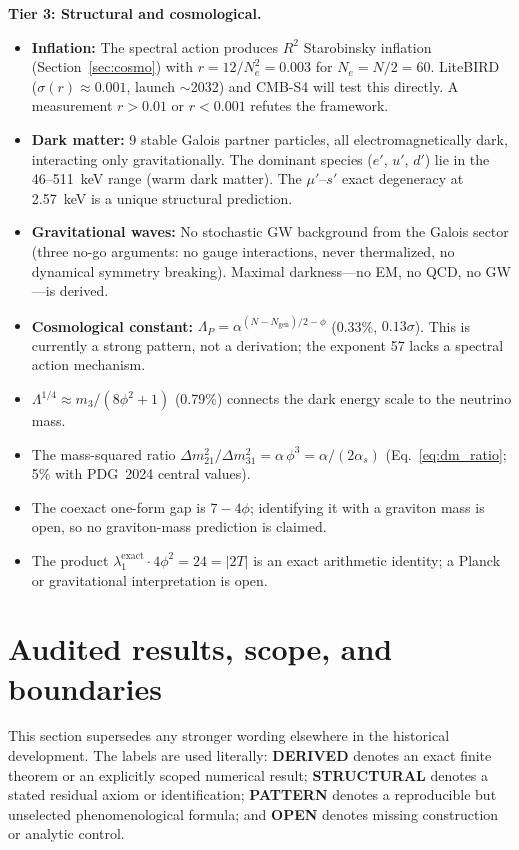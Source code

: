 \documentclass[12pt,a4paper]{article}
\theoremstyle{definition}
\begin{document}
\textbf{Tier 3: Structural and cosmological.}
\begin{itemize}
\item \textbf{Inflation:} The spectral action produces $R^2$ Starobinsky inflation (Section~\ref{sec:cosmo}) with $r = 12/N_e^2 = 0.003$ for $N_e = N/2 = 60$.  LiteBIRD~\cite{LiteBIRD2023} ($\sigma(r) \approx 0.001$, launch $\sim$2032) and CMB-S4 will test this directly.  A measurement $r > 0.01$ or $r < 0.001$ refutes the framework.
\item \textbf{Dark matter:} 9 stable Galois partner particles, all electromagnetically dark, interacting only gravitationally.  The dominant species ($e'$, $u'$, $d'$) lie in the 46--511~keV range (warm dark matter).  The $\mu'$--$s'$ exact degeneracy at 2.57~keV is a unique structural prediction.
\item \textbf{Gravitational waves:} No stochastic GW background from the Galois sector (three no-go arguments: no gauge interactions, never thermalized, no dynamical symmetry breaking).  Maximal darkness---no EM, no QCD, no GW---is derived.
\item \textbf{Cosmological constant:} $\Lambda_P = \alpha^{(N - N_{\text{gen}})/2 - \phi}$ (0.33\%, $0.13\sigma$).  This is currently a strong pattern, not a derivation; the exponent 57 lacks a spectral action mechanism.
\item $\Lambda^{1/4} \approx m_3 / (8\phi^2 + 1)$ (0.79\%) connects the dark energy scale to the neutrino mass.
\item The mass-squared ratio $\Delta m^2_{21}/\Delta m^2_{31} = \alpha\,\phi^3 = \alpha/(2\alpha_s)$ (Eq.~\ref{eq:dm_ratio}; 5\% with PDG~2024 central values).
\item The coexact one-form gap is $7-4\phi$; identifying it with a graviton mass is open, so no graviton-mass prediction is claimed.
\item The product $\lambda_1^{\text{exact}}\cdot4\phi^2=24=|2T|$ is an exact arithmetic identity; a Planck or gravitational interpretation is open.
\end{itemize}


\section{Audited results, scope, and boundaries}
\label{sec:audited_consolidation}

This section supersedes any stronger wording elsewhere in the historical development.  The labels are used literally: \textbf{DERIVED} denotes an exact finite theorem or an explicitly scoped numerical result; \textbf{STRUCTURAL} denotes a stated residual axiom or identification; \textbf{PATTERN} denotes a reproducible but unselected phenomenological formula; and \textbf{OPEN} denotes missing construction or analytic control.
\end{document}
